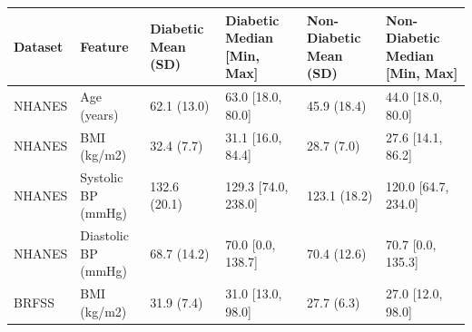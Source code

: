 \begin{tabular}{llllll}
\toprule
Dataset & Feature & Diabetic Mean (SD) & Diabetic Median [Min, Max] & Non-Diabetic Mean (SD) & Non-Diabetic Median [Min, Max] \\
\midrule
NHANES & Age (years) & 62.1 (13.0) & 63.0 [18.0, 80.0] & 45.9 (18.4) & 44.0 [18.0, 80.0] \\
NHANES & BMI (kg/m2) & 32.4 (7.7) & 31.1 [16.0, 84.4] & 28.7 (7.0) & 27.6 [14.1, 86.2] \\
NHANES & Systolic BP (mmHg) & 132.6 (20.1) & 129.3 [74.0, 238.0] & 123.1 (18.2) & 120.0 [64.7, 234.0] \\
NHANES & Diastolic BP (mmHg) & 68.7 (14.2) & 70.0 [0.0, 138.7] & 70.4 (12.6) & 70.7 [0.0, 135.3] \\
BRFSS & BMI (kg/m2) & 31.9 (7.4) & 31.0 [13.0, 98.0] & 27.7 (6.3) & 27.0 [12.0, 98.0] \\
\bottomrule
\end{tabular}
